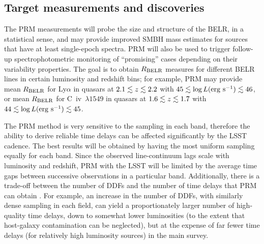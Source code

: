 
\subsection{Target measurements and discoveries}
\label{sec:\secname:targets}



The PRM measurements will probe the size and structure of the BELR,
in a statistical sense, and may provide improved SMBH mass estimates
for sources that have at least single-epoch spectra. PRM will also be
used to trigger follow-up spectrophotometric monitoring of ``promising''
cases depending on their variability properties. The goal is to obtain
$R_{\rm BELR}$ measures for different BELR lines in certain luminosity
and redshift bins; for example, PRM may provide mean $R_{\rm BELR}$ for
Ly$\alpha$ in quasars at $2.1\lesssim z \lesssim 2.2$ with
$45 \lesssim \log L ({\rm erg~s}^{-1}) \lesssim 46$, or mean $R_{\rm BELR}$
for C~{\sc iv}~$\lambda 1549$ in quasars at $1.6\lesssim z \lesssim 1.7$
with $44 \lesssim \log L ({\rm erg~s}^{-1}) \lesssim 45$.

The PRM method is very sensitive to the sampling in each band,
therefore the ability to derive reliable time delays can be affected
significantly by the LSST cadence. The best results will be obtained
by having the most uniform sampling equally for each band.
%
Since the observed line-continuum lags scale with luminosity and redshift,
PRM with the LSST will be limited by the average time gaps between successive
observations in a particular band.
%
Additionally, there is a trade-off between the number of DDFs and the
number of time delays that PRM can obtain \citep{CheloucheEtal2014}.
For example, an increase in the number of DDFs, with similarly dense
sampling in each field, can yield a proportionately larger number of
high-quality time delays, down to somewhat lower luminosities (to the
extent that host-galaxy contamination can be neglected), but at the
expense of far fewer time delays (for relatively high luminosity
sources) in the main survey.

